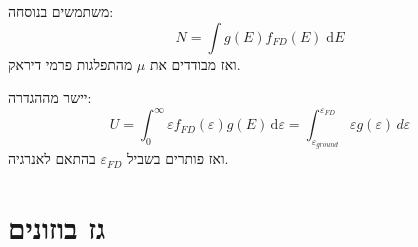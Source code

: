 \documentclass{tstextbook}
\begin{document}
\begin{proposition}
משתמשים בנוסחה:
$$N=\int g\left( E \right)f_{FD}\left( E \right) \;\mathrm{d} E $$
ואז מבודדים את \(\mu\) מהתפלגות פרמי דיראק.

\end{proposition}
\begin{proposition}
יישר מההגדרה:
$$U=\int_{0}^{\infty}  \varepsilon f_{FD}\left( \varepsilon \right)g(E)\, \mathrm{d}\varepsilon= \int_{\varepsilon_{ground}}^{\varepsilon_{FD}}\varepsilon g\left( \varepsilon \right)  \, d\varepsilon  $$
ואז פותרים בשביל \(\varepsilon_{FD}\) בהתאם לאנרגיה.

\end{proposition}
\section{גז בוזונים}
\end{document}
